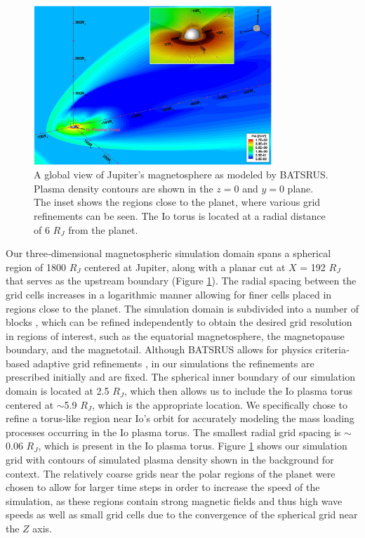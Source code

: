 \begin{figure}
    \centering
    \includegraphics[width=0.8\textwidth]{images2/global-mhd-image.jpg}
    \caption{A global view of Jupiter's magnetosphere as modeled by BATSRUS. Plasma density contours are shown in the $z=0$ and $y=0$ plane. The inset shows the regions close to the planet, where various grid refinements can be seen. The Io torus is located at a radial distance of 6 $R_J$ from the planet.}
    \label{fig:global-mhd-image}
\end{figure}

Our three‐dimensional magnetospheric simulation domain spans a spherical region of 1800 $R_J$ centered at Jupiter, along with a planar cut at $X$ = 192 $R_J$ that serves as the upstream boundary (Figure \ref{fig:global-mhd-image}). The radial spacing between the grid cells increases in a logarithmic manner allowing for finer cells placed in regions close to the planet. The simulation domain is subdivided into a number of blocks \cite{Powell1999a}, which can be refined independently to obtain the desired grid resolution in regions of interest, such as the equatorial magnetosphere, the magnetopause boundary, and the magnetotail. Although BATSRUS allows for physics criteria‐based adaptive grid refinements \cite{Toth2012a}, in our simulations the refinements are prescribed initially and are fixed. The spherical inner boundary of our simulation domain is located at 2.5 $R_J$, which then allows us to include the Io plasma torus centered at $\sim$5.9 $R_J$, which is the appropriate location. We specifically chose to refine a torus‐like region near Io's orbit for accurately modeling the mass loading processes occurring in the Io plasma torus. The smallest radial grid spacing is $\sim$0.06 $R_J$, which is present in the Io plasma torus. Figure \ref{fig:global-mhd-image} shows our simulation grid with contours of simulated plasma density shown in the background for context. The relatively coarse grids near the polar regions of the planet were chosen to allow for larger time steps in order to increase the speed of the simulation, as these regions contain strong magnetic fields and thus high wave speeds as well as small grid cells due to the convergence of the spherical grid near the $Z$ axis. 

